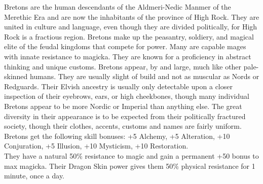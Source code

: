 \documentclass[12pt]{book}
\begin{document}
Bretons are the human descendants of the Aldmeri-Nedic Manmer of the Merethic Era and are now the inhabitants of the province of High Rock. They are united in culture and language, even though they are divided politically, for High Rock is a fractious region. Bretons make up the peasantry, soldiery, and magical elite of the feudal kingdoms that compete for power. Many are capable mages with innate resistance to magicka. They are known for a proficiency in abstract thinking and unique customs. Bretons appear, by and large, much like other pale-skinned humans. They are usually slight of build and not as muscular as Nords or Redguards. Their Elvish ancestry is usually only detectable upon a closer inspection of their eyebrows, ears, or high cheekbones, though many individual Bretons appear to be more Nordic or Imperial than anything else. The great diversity in their appearance is to be expected from their politically fractured society, though their clothes, accents, customs and names are fairly uniform.\\

Bretons get the following skill bonuses: +5 Alchemy, +5 Alteration, +10 Conjuration, +5 Illusion, +10 Mysticism, +10 Restoration.\\

They have a natural 50\% resistance to magic and gain a permanent +50 bonus to max magicka. Their Dragon Skin power gives them 50\% physical resistance for 1 minute, once a day.
\end{document}
